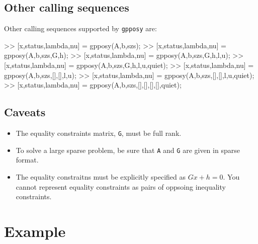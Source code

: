 \documentclass[12pt]{article}
\newcommand{\gpposy}{\texttt{gpposy}\xspace}
\begin{document}
\subsection{Other calling sequences}

Other calling sequences supported by \gpposy are:
\begin{code}
>> [x,status,lambda,nu] = gpposy(A,b,szs);
>> [x,status,lambda,nu] = gpposy(A,b,szs,G,h);
>> [x,status,lambda,nu] = gpposy(A,b,szs,G,h,l,u);
>> [x,status,lambda,nu] = gpposy(A,b,szs,G,h,l,u,quiet);
>> [x,status,lambda,nu] = gpposy(A,b,szs,[],[],l,u);
>> [x,status,lambda,nu] = gpposy(A,b,szs,[],[],l,u,quiet);
>> [x,status,lambda,nu] = gpposy(A,b,szs,[],[],[],[],quiet);
\end{code}

\subsection{Caveats}

\begin{itemize}
\item The equality constraints matrix, \verb+G+, must be full rank.

\item To solve a large sparse problem, be sure that 
\verb+A+ and \verb+G+ are given in sparse format.

\item The equality constraitns must be explicitly specified as 
$Gx + h = 0$.  You cannot represent equality constraints as pairs of
oppsoing inequality constraints.

\end{itemize}

\section{Example}
\end{document}
